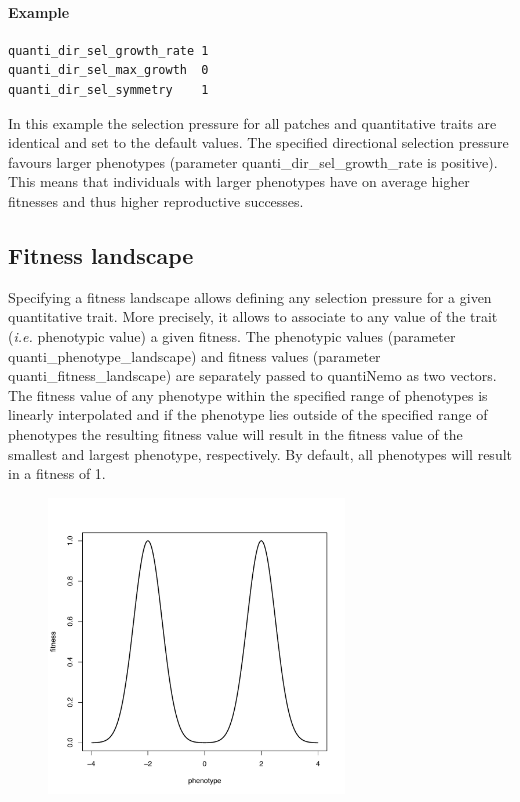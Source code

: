 \documentclass[letterpaper,12pt,oneside]{book}
\begin{document}
\paragraph{Example}\hspace*{\fill}
\begin{lstlisting}[frame=single]
quanti_dir_sel_growth_rate 1    
quanti_dir_sel_max_growth  0    
quanti_dir_sel_symmetry    1    
\end{lstlisting}
In this example the selection pressure for all patches and quantitative traits are identical and set to the default values. The specified directional selection pressure favours larger phenotypes (parameter \textsf{quanti\_dir\_sel\_growth\_rate} is positive). This means that individuals with larger phenotypes have on average higher fitnesses and thus higher reproductive successes.

\subsection{Fitness landscape}\label{sub:FitnessLandscape}
Specifying a fitness landscape allows defining any selection pressure for a given quantitative trait. More precisely, it allows to associate to any value of the trait (\textit{i.e.} phenotypic value) a given fitness. The phenotypic values (parameter \textsf{quanti\_phenotype\_landscape}) and fitness values (parameter \textsf{quanti\_fitness\_landscape}) are separately passed to quantiNemo as two vectors. The fitness value of any phenotype within the specified range of phenotypes is linearly interpolated and if the phenotype lies outside of the specified range of phenotypes the resulting fitness value will result in the fitness value of the smallest and largest phenotype, respectively. By default, all phenotypes will result in a fitness of 1. 

\begin{figure}[h]
    \centering
        \includegraphics[width=0.70\textwidth]{fitness-landscape-selection.pdf}
    \label{fig:fitness-landscape-selection}
\end{figure}
\end{document}
